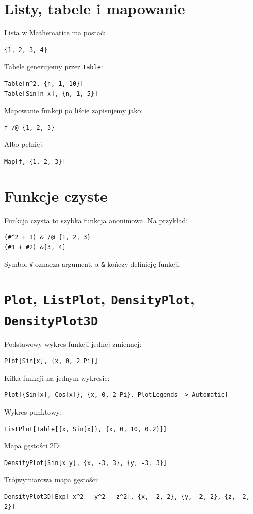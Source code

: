 \section{Listy, tabele i mapowanie}

Lista w Mathematice ma postać:
\begin{verbatim}
{1, 2, 3, 4}
\end{verbatim}
Tabele generujemy przez \texttt{Table}:
\begin{verbatim}
Table[n^2, {n, 1, 10}]
Table[Sin[n x], {n, 1, 5}]
\end{verbatim}
Mapowanie funkcji po liście zapisujemy jako:
\begin{verbatim}
f /@ {1, 2, 3}
\end{verbatim}
Albo pełniej:
\begin{verbatim}
Map[f, {1, 2, 3}]
\end{verbatim}

\section{Funkcje czyste}

Funkcja czysta to szybka funkcja anonimowa. Na przykład:
\begin{verbatim}
(#^2 + 1) & /@ {1, 2, 3}
(#1 + #2) &[3, 4]
\end{verbatim}
Symbol \texttt{\#} oznacza argument, a \texttt{\&} kończy definicję funkcji.

\section{\texttt{Plot}, \texttt{ListPlot}, \texttt{DensityPlot}, \texttt{DensityPlot3D}}

Podstawowy wykres funkcji jednej zmiennej:
\begin{verbatim}
Plot[Sin[x], {x, 0, 2 Pi}]
\end{verbatim}
Kilka funkcji na jednym wykresie:
\begin{verbatim}
Plot[{Sin[x], Cos[x]}, {x, 0, 2 Pi}, PlotLegends -> Automatic]
\end{verbatim}
Wykres punktowy:
\begin{verbatim}
ListPlot[Table[{x, Sin[x]}, {x, 0, 10, 0.2}]]
\end{verbatim}
Mapa gęstości 2D:
\begin{verbatim}
DensityPlot[Sin[x y], {x, -3, 3}, {y, -3, 3}]
\end{verbatim}
Trójwymiarowa mapa gęstości:
\begin{verbatim}
DensityPlot3D[Exp[-x^2 - y^2 - z^2], {x, -2, 2}, {y, -2, 2}, {z, -2, 2}]
\end{verbatim}

